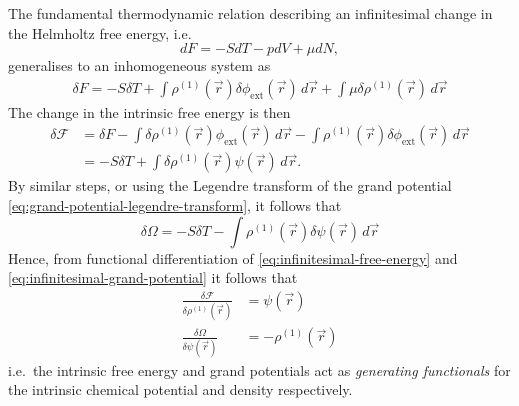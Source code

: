 The fundamental thermodynamic relation describing an infinitesimal change in the Helmholtz free energy, i.e.\
\begin{equation*}
  dF = -S dT - p dV + \mu dN,
\end{equation*}
generalises to an inhomogeneous system as
\begin{equation*}
  \begin{split}
    \delta F
    =
    - S \delta T
    + \int \rho^{(1)}(\vec{r}) \delta \phi_\mathrm{ext}(\vec{r}) \, d\vec{r}
    + \int \mu \delta \rho^{(1)}(\vec{r}) \, d\vec{r}
  \end{split}
\end{equation*}
The change in the intrinsic free energy is then
\begin{equation}\label{eq:infinitesimal-free-energy}
  \begin{split}
    \delta \mathcal{F}
    &=
    \delta F
    - \int \delta \rho^{(1)}(\vec{r}) \phi_\mathrm{ext}(\vec{r}) \, d\vec{r}
    - \int \rho^{(1)}(\vec{r}) \delta \phi_\mathrm{ext}(\vec{r}) \, d\vec{r}
    \\ &=
    - S \delta T
    + \int \delta \rho^{(1)}(\vec{r}) \psi(\vec{r}) \, d\vec{r}.
  \end{split}
\end{equation}
By similar steps, or using the Legendre transform of the grand potential \eqref{eq:grand-potential-legendre-transform}, it follows that
\begin{equation}\label{eq:infinitesimal-grand-potential}
  \delta \Omega
  =
  - S \delta T
  - \int \rho^{(1)}(\vec{r}) \delta \psi(\vec{r}) \, d\vec{r}
\end{equation}
Hence, from functional differentiation of \eqref{eq:infinitesimal-free-energy} and \eqref{eq:infinitesimal-grand-potential} it follows that
\begin{align}
  \label{eq:psi-generator}
  \frac{\delta \mathcal{F}}{\delta \rho^{(1)}(\vec{r})}
  &=
  \psi(\vec{r})
  \\
  \label{eq:rho-generator}
  \frac{\delta \Omega}{\delta \psi(\vec{r})}
  &=
  - \rho^{(1)}(\vec{r})
\end{align}
i.e.\ the intrinsic free energy and grand potentials act as \emph{generating functionals} for the intrinsic chemical potential and density respectively.

